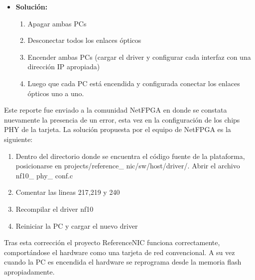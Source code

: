 \begin{itemize}
\item \textbf{Soluci\'on:}
\begin{enumerate}
\item Apagar ambas PCs
\item Desconectar todos los enlaces \'opticos
\item Encender ambas PCs (cargar el driver y configurar cada interfaz con una direcci\'on IP apropiada)
\item Luego que cada PC est\'a encendida y configurada conectar los enlaces \'opticos uno a uno.
\end{enumerate}

\end{itemize}

Este reporte fue enviado a la comunidad NetFPGA en donde se constata nuevamente la presencia de un error, esta vez en la configuraci\'on de los chips PHY de la tarjeta. La soluci\'on propuesta por el equipo de NetFPGA es la siguiente:

\begin{enumerate}
\item Dentro del directorio donde se encuentra el c\'odigo fuente de la plataforma, posicionarse en 
	  projects/reference\_ nic/sw/host/driver/. Abrir el archivo nf10\_ phy\_ conf.c 
\item Comentar las lineas 217,219 y 240
\item Recompilar el driver nf10
\item Reiniciar la PC y cargar el nuevo driver
\end{enumerate}

Tras esta correcci\'on el proyecto ReferenceNIC funciona correctamente, comportándose el hardware como una tarjeta de red convencional. A su vez cuando la PC es encendida el hardware se reprograma desde la memoria flash apropiadamente.